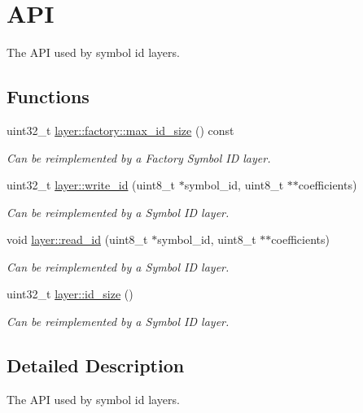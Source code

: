 \hypertarget{group__symbol__id__api}{\section{A\-P\-I}
\label{group__symbol__id__api}
}


The A\-P\-I used by symbol id layers.  


\subsection*{Functions}
\begin{DoxyCompactItemize}
\item 
uint32\-\_\-t \hyperlink{group__symbol__id__api_gaf38c199730c068ff1695f24067d19887}{layer\-::factory\-::max\-\_\-id\-\_\-size} () const 
\begin{DoxyCompactList}\small\item\em Can be reimplemented by a Factory Symbol I\-D layer. \end{DoxyCompactList}\item 
uint32\-\_\-t \hyperlink{group__symbol__id__api_ga76aeaeeeafe38e9d4ef34a3395a0f3a9}{layer\-::write\-\_\-id} (uint8\-\_\-t $\ast$symbol\-\_\-id, uint8\-\_\-t $\ast$$\ast$coefficients)
\begin{DoxyCompactList}\small\item\em Can be reimplemented by a Symbol I\-D layer. \end{DoxyCompactList}\item 
void \hyperlink{group__symbol__id__api_ga8df39a52500dd9c57d41af23882e8b60}{layer\-::read\-\_\-id} (uint8\-\_\-t $\ast$symbol\-\_\-id, uint8\-\_\-t $\ast$$\ast$coefficients)
\begin{DoxyCompactList}\small\item\em Can be reimplemented by a Symbol I\-D layer. \end{DoxyCompactList}\item 
uint32\-\_\-t \hyperlink{group__symbol__id__api_ga382b6aceb7bc0139f35005d2fba76dfa}{layer\-::id\-\_\-size} ()
\begin{DoxyCompactList}\small\item\em Can be reimplemented by a Symbol I\-D layer. \end{DoxyCompactList}\end{DoxyCompactItemize}


\subsection{Detailed Description}
The A\-P\-I used by symbol id layers. 

